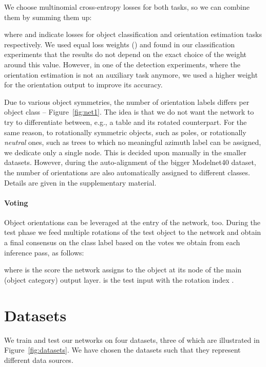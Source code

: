 \documentclass{bmvc2k}
\begin{document}
We choose multinomial cross-entropy losses \cite{rubinstein_cross-entropy_2013} for both tasks, so we can combine them by summing them up:


\noindent where  and  indicate losses for object classification and orientation estimation tasks respectively. We used equal loss weights () and found in our classification experiments that the results do not depend on the exact choice of the weight  around this value. However, in one of the detection experiments, where the orientation estimation is not an auxiliary task anymore, we used a higher weight for the orientation output to improve its accuracy.

Due to various object symmetries, the number of orientation labels differs per object class -- Figure~\ref{fig:net1}.
The idea is that we do not want the network to try to differentiate between, e.g., a table and its  rotated counterpart. For the same reason, to rotationally symmetric objects, such as poles, or rotationally \emph{neutral} ones, such as trees to which no meaningful azimuth label can be assigned, we dedicate only a single node.
This is decided upon manually in the smaller datasets. However, during the auto-alignment of the bigger Modelnet40 dataset, the number of orientations are also automatically assigned to different classes. Details are given in the supplementary material.

\paragraph{Voting}
Object orientations can be leveraged at the entry of the network, too. During the test phase we feed multiple rotations of the test object to the network and obtain a final consensus on the class label based on the votes we obtain from each inference pass, as follows:



\noindent where  is the score the network assigns to the object at its  node of the main (object category) output layer.  is the test input with the rotation index .

\section{Datasets}
We train and test our networks on four datasets, three of which are illustrated in Figure~\ref{fig:datasets}. We have chosen the datasets such that they represent different data sources.
\end{document}
